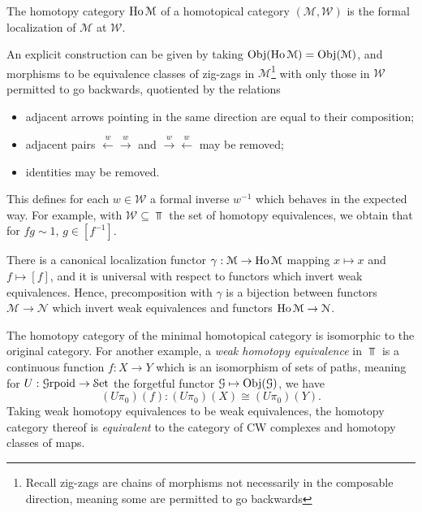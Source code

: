 \begin{definition}\label{dfn:2.2}
	The homotopy category $\operatorname{Ho} \mathcal{M} $ of a homotopical category $(\mathcal{M} ,\mathcal{W} )$ is the formal localization of $\mathcal{M} $ at $\mathcal{W} $.
\end{definition}

An explicit construction can be given by taking $\operatorname{Obj}(\operatorname{Ho} \mathcal{M} ) =\operatorname{Obj}(\mathcal{M} ) $, and morphisms to be equivalence classes of zig-zags in $\mathcal{M} $\footnote{Recall zig-zags are chains of morphisms not necessarily in the composable direction, meaning some are permitted to go backwards} with only those in $\mathcal{W} $ permitted to go backwards, quotiented by the relations
\begin{itemize}
	\item adjacent arrows pointing in the same direction are equal to their composition;
	\item adjacent pairs $\overset{w}{\leftarrow}\overset{w}{\rightarrow}$ and $\overset{w}{\rightarrow}\overset{w}{\leftarrow}$ may be removed;
	\item identities may be removed.
\end{itemize}
This defines for each $w\in \mathcal{W} $ a formal inverse $w^{-1} $ which behaves in the expected way. For example, with $\mathcal{W} \subseteq \Top $ the set of homotopy equivalences, we obtain that for $fg\sim 1$, $g\in [f^{-1} ]$.

There is a canonical localization functor $\gamma : \mathcal{M}  \to \operatorname{Ho} \mathcal{M} $ mapping $x\mapsto x$ and $f\mapsto [f]$, and it is universal with respect to functors which invert weak equivalences. Hence, precomposition with $\gamma$ is a bijection between functors $\mathcal{M} \to \mathcal{N} $ which invert weak equivalences and functors $\operatorname{Ho} \mathcal{M} \to \mathcal{N} $.

The homotopy category of the minimal homotopical category is isomorphic to the original category. For another example, a \emph{weak homotopy equivalence} in $\Top $ is a continuous function $f : X \to Y$ which is an isomorphism of sets of paths, meaning for $U : \mathcal{G} \mathrm{rpoid}  \to \mathcal{S}\mathrm{et} $ the forgetful functor $\mathcal{G} \mapsto \operatorname{Obj}(\mathcal{G}) $, we have
\[
	(U\pi_0)(f) : (U\pi_0)(X)\cong (U\pi_0)(Y)
.\]
Taking weak homotopy equivalences to be weak equivalences, the homotopy category thereof is \emph{equivalent} to the category of CW complexes and homotopy classes of maps.

